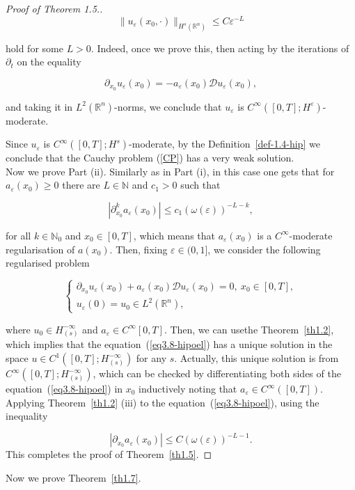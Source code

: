 \documentclass[12pt]{amsart}
\theoremstyle{definition}
\begin{document}
\begin{proof}[Proof of Theorem 1.5.]
\begin{equation}
\|u_{\varepsilon}(x_0,\cdot)\|_{ H^s(\mathbb{R}^n)}\leq C\varepsilon^{-L}
\label{eq3.6-hipoel}
\end{equation}

hold for some \(L>0\). Indeed, once we prove this, then acting by the iterations of \(\partial_{t}\) on the equality

\[
\partial_{x_0}u_{\varepsilon}(x_0)=-a_{\varepsilon}(x_0){\mathcal{D}}u_{\varepsilon}(x_0),
\]

and taking it in \(L^{2}({\mathbb{R}^n})\)-norms, we conclude that \(u_{\varepsilon}\) is \(C^{\infty}([0,T];H^{\varepsilon})\)-moderate. 

Since \(u_{\varepsilon}\) is \(C^{\infty}([0,T];H^{s})\)-moderate, by the Definition~\ref{def-1.4-hip} we conclude that the Cauchy problem (\ref{CP}) has a very weak solution.\\

Now we prove Part (ii). Similarly as in Part (i), in this case one gets that for \(a_{\varepsilon}(x_0)\geq 0\) there are \(L\in\mathbb{N}\) and \(c_{1}>0\) such that

\begin{equation}
|\partial_{x_0}^{k}a_{\varepsilon}(x_0)|\leq c_{1}(\omega(\varepsilon))^{-L-k}, 
\label{eq3.7-hipoel}
\end{equation}

for all \(k\in\mathbb{N}_{0}\) and \(x_0\in[0,T]\), which means that \(a_{\varepsilon}(x_0)\) is a \(C^{\infty}\)-moderate regularisation of \(a(x_0)\). Then, fixing \(\varepsilon\in(0,1]\), we consider the following regularised problem

\begin{equation}
\left\{
\begin{array}{l}
\partial_{x_0}u_{\varepsilon}(x_0)+a_{\varepsilon}(x_0){\mathcal{D}}u_{\varepsilon}(x_0)=0,\ x_0\in[0,T], \\
u_{\varepsilon}(0)=u_{0}\in L^{2}(\mathbb{R}^n),
\end{array}
\right. 
\label{eq3.8-hipoel}
\end{equation}

where \(u_{0}\in H_{{(s)}}^{-\infty}\) and \(a_{\varepsilon}\in C^{\infty}[0,T]\). Then, we can usethe Theorem~\ref{th1.2}, which implies that the equation~(\ref{eq3.8-hipoel}) has a unique solution in the space \(u\in C^{1}([0,T];H_{{(s)}}^{-\infty})\) for any \(s\). Actually, this unique solution is from \(C^{\infty}([0,T];H_{{(s)}}^{-\infty})\), which can be checked by differentiating both sides of the equation~(\ref{eq3.8-hipoel}) in \(x_0\) inductively noting that \(a_{\varepsilon}\in C^{\infty}([0,T])\). Applying Theorem~\ref{th1.2} (iii) to the equation~(\ref{eq3.8-hipoel}), using the inequality

\[
|\partial_{x_0}a_{\varepsilon}(x_0)|\leq C(\omega(\varepsilon))^{-L-1}.
\]
This completes the proof of Theorem~\ref{th1.5}. 
\end{proof}
Now we prove Theorem~\ref{th1.7}.
\end{document}
